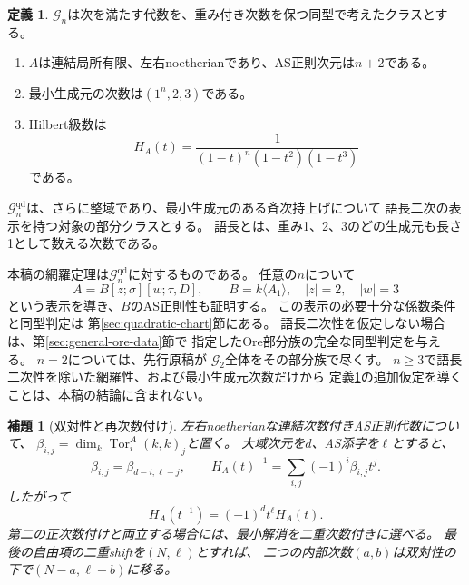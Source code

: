 \documentclass[11pt,a4paper]{ltjsarticle}
\newtheorem{lemma}[theorem]{補題}
\theoremstyle{definition}
\newtheorem{definition}[theorem]{定義}
\newcommand{\Tor}{\operatorname{Tor}}
\newcommand{\Gclass}{\mathcal G}
\begin{document}
\begin{definition}\label{def:general-class}
$\Gclass_n$は次を満たす代数を、重み付き次数を保つ同型で考えたクラスとする。
\begin{enumerate}
\item $A$は連結局所有限、左右noetherianであり、AS正則次元は$n+2$である。
\item 最小生成元の次数は$(1^n,2,3)$である。
\item Hilbert級数は
\begin{equation}\label{eq:general-target-hilbert}
H_A(t)=\frac1{(1-t)^n(1-t^2)(1-t^3)}
\end{equation}
である。
\end{enumerate}
$\Gclass_n^{\mathrm{qd}}$は、さらに整域であり、最小生成元のある斉次持上げについて
語長二次の表示を持つ対象の部分クラスとする。
語長とは、重み1、2、3のどの生成元も長さ1として数える次数である。
\end{definition}

本稿の網羅定理は$\Gclass_n^{\mathrm{qd}}$に対するものである。
任意の$n$について
\[
A=B[z;\sigma][w;\tau,D],\qquad
B=k\langle A_1\rangle,\quad |z|=2,\quad |w|=3
\]
という表示を導き、$B$のAS正則性も証明する。
この表示の必要十分な係数条件と同型判定は
第\ref{sec:quadratic-chart}節にある。
語長二次性を仮定しない場合は、第\ref{sec:general-ore-data}節で
指定したOre部分族の完全な同型判定を与える。
$n=2$については、先行原稿\cite[定理1.2]{G1123}が
$\Gclass_2$全体をその部分族で尽くす。
$n\geq3$で語長二次性を除いた網羅性、および最小生成元次数だけから
定義\ref{def:general-class}の追加仮定を導くことは、本稿の結論に含まれない。

\begin{lemma}[双対性と再次数付け]\label{lem:duality-regrading}
左右noetherianな連結次数付きAS正則代数について、
$\beta_{i,j}=\dim_k\Tor_i^A(k,k)_j$と置く。
大域次元を$d$、AS添字を$\ell$とすると、
\begin{equation}\label{eq:betti-duality}
\beta_{i,j}=\beta_{d-i,\ell-j},\qquad
H_A(t)^{-1}=\sum_{i,j}(-1)^i\beta_{i,j}t^j.
\end{equation}
したがって
\begin{equation}\label{eq:hilbert-reciprocity}
H_A(t^{-1})=(-1)^dt^\ell H_A(t).
\end{equation}
第二の正次数付けと両立する場合には、最小解消を二重次数付きに選べる。
最後の自由項の二重shiftを$(N,\ell)$とすれば、
二つの内部次数$(a,b)$は双対性の下で$(N-a,\ell-b)$に移る。
\end{lemma}
\end{document}
